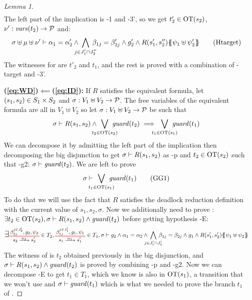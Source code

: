 \documentclass{article}
\begin{document}
\begin{proof}[Lemma 1]
\begin{multline}
	\end{multline}
	The left part of the implication is \hyp{1} and \hyp{3'}, so we get \(t'_2 \in \mathrm{OT}{\left(s_2\right)}\), \(\nu': \mathit{vars}{\left(t_2\right)} \to \mathcal{P}\) and:
	\[ \sigma \uplus \mu \uplus \nu' \vdash \alpha_1 = \alpha'_2 \wedge \bigwedge_\subbox{j \in J'_1 \cap J''_2} \beta_{1j} = \beta'_{2j} \wedge g'_2 \wedge R\mpar{s'_1, s''_2}\psubst{\psi_1 \uplus \psi'_2} \hyp{target} \]
	The witnesses for  are \(t'_2\) and \(t_1\), and the rest is proved with a combination of \hyp{target} and \hyp{3'}.
\item[\bf(\ref{eq:WD})\(\impliedby\)(\ref{eq:ID}):] %
	If \(R\) satisfies the equivalent formula, let \({\left(s_1, s_2\right)} \in S_1 \times S_2\) and \(\sigma: V_1 \uplus V_2 \to \mathcal{P}\).
	The free variables of the equivalent formula are all in \(V_1 \uplus V_2\) so let \(\sigma: V_1 \uplus V_2 \to \mathcal{P}\) be such that
	\[ \sigma \vdash R\mpar{s_1, s_2} \wedge \bigvee_\subbox{t_2 \in \fOT{s_2}} \fguard{t_2} \implies \bigvee_\subbox{t_1 \in \fOT{s_1}} \fguard{t_1} \]
	We can decompose it by admitting the left part of the implication then decomposing the big disjunction to get \(\sigma \vdash R{\left(s_1, s_2\right)}\) as \hyp{p} and \(t_2 \in \mathrm{OT}{\left(s_2\right)}\) such that \hyp{g2}: \(\sigma \vdash \mathit{guard}{\left(t_2\right)}\).
	We are left to prove \[ \sigma \vdash \bigvee_\subbox{t_1 \in \fOT{s_1}} \fguard{t_1} \goal{G1} \]
	To do that we will use the fact that \(R\) satisfies the deadlock reduction definition with the current value of \(s_1, s_2, \sigma\).
	Now we additionally need to prove : \(\exists t_2 \in \mathrm{OT}{\left(s_2\right)}, \sigma \vdash R{\left(s_1, s_2\right)} \wedge \mathit{guard}{\left(t_2\right)}\) before getting hypothesis \hyp{E}:
	\[ \bigsymb{\exists} \OTx{2}{}{2}{2} \in T_2, \OTx{1}{}{1}{1} \in T_1, \sigma \vdash g_2 \wedge \alpha_1 = \alpha_2 \wedge \bigwedge_\subbox{j \in J'_1 \cap J'_2} \beta_{1j} = \beta_{2j} \wedge g_1 \wedge R\mpar{s'_1, s'_2}\psubst{\psi_1 \uplus \psi_2} \]
	The witness of  is \(t_2\) obtained previously in the big disjunction, and \(\sigma \vdash R{\left(s_1, s_2\right)} \wedge \mathit{guard}{\left(t_2\right)}\) is proved by combining \hyp{p} and \hyp{g2}.
	Now we can decompose \hyp{E} to get \(t_1 \in T_1\), which we know is also in \(\mathrm{OT}{\left(s_1\right)}\), a transition that we won't use and \(\sigma \vdash \mathit{guard}{\left(t_1\right)}\) which is what we needed to prove the branch \(t_1\) of .
\end{proof}

\end{document}
